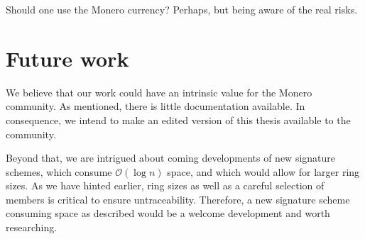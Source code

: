 Should one use the Monero currency? Perhaps, but being aware of the real risks.

   
 

\section{Future work}
\label{sec:futureWork}

We believe that our work could have an intrinsic value for the Monero community. As mentioned, there is little documentation
available. In consequence, we intend to make an edited version of this thesis available to the community.

Beyond that, we are intrigued about coming developments of new signature schemes, which consume \(\mathcal{O}(\log n)\)
space, and which would allow for larger ring sizes.
As we have hinted earlier, ring sizes as well as a careful selection of members is critical to ensure untraceability.
Therefore, a new signature scheme consuming space as described would be a welcome development and worth researching.




